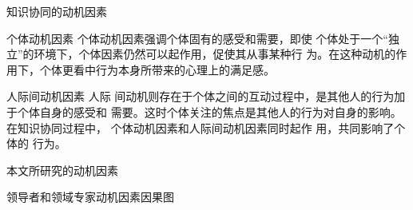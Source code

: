 \documentclass[slidestop,compress,mathserif,table]{beamer}
\begin{document}
   \begin{frame}{知识协同的动机因素}
     \begin{block}{个体动机因素}
       个体动机因素强调个体固有的感受和需要，即使
个体处于一个“独立”的环境下，个体因素仍然可以起作用，促使其从事某种行
为。在这种动机的作用下，个体更看中行为本身所带来的心理上的满足感。
     \end{block}
\vfill
\begin{block}{人际间动机因素}
  人际
间动机则存在于个体之间的互动过程中，是其他人的行为加于个体自身的感受和
需要。这时个体关注的焦点是其他人的行为对自身的影响。在知识协同过程中，
个体动机因素和人际间动机因素同时起作
用，共同影响了个体的
行为。
\end{block}
   \end{frame}

   \begin{frame}{本文所研究的动机因素}
   \end{frame}

   \begin{frame}{领导者和领域专家动机因素因果图}
   \end{frame}
\end{document}
